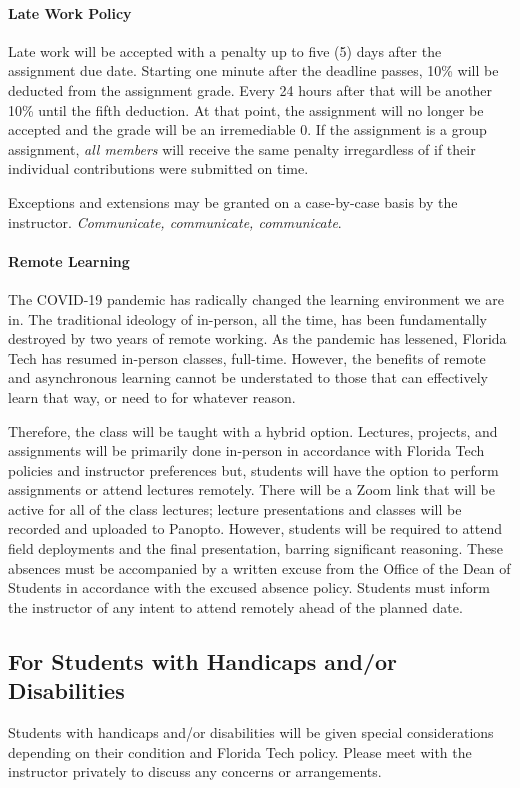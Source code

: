 \documentclass[
	letterpaper, %
	fontsize=10pt, %
	twoside=true, %
	numbers=noenddot, %
]{kaobook}
\begin{document}
\paragraph*{Late Work Policy} Late work will be accepted with a penalty up to five (5) days after the assignment due date.
Starting one minute after the deadline passes, 10\% will be deducted from the assignment grade.
Every 24 hours after that will be another 10\% until the fifth deduction.
At that point, the assignment will no longer be accepted and the grade will be an irremediable 0.
If the assignment is a group assignment, \emph{all members} will receive the same penalty irregardless of if their individual contributions were submitted on time.

Exceptions and extensions may be granted on a case-by-case basis by the instructor.
\emph{Communicate, communicate, communicate}.

\paragraph*{Remote Learning} The COVID-19 pandemic has radically changed the learning environment we are in.
The traditional ideology of in-person, all the time, has been fundamentally destroyed by two years of remote working.
As the pandemic has lessened, Florida Tech has resumed in-person classes, full-time.
However, the benefits of remote and asynchronous learning cannot be understated to those that can effectively learn that way, or need to for whatever reason.

Therefore, the class will be taught with a hybrid option.
Lectures, projects, and assignments will be primarily done in-person in accordance with Florida Tech policies and instructor preferences but, students will have the option to perform assignments or attend lectures remotely.
There will be a Zoom link that will be active for all of the class lectures; lecture presentations and classes will be recorded and uploaded to Panopto.
However, students will be required to attend field deployments and the final presentation, barring significant reasoning.
These absences must be accompanied by a written excuse from the Office of the Dean of Students in accordance with the excused absence policy.
Students must inform the instructor of any intent to attend remotely ahead of the planned date.

\subsection*{For Students with Handicaps and/or Disabilities} \label{ssec:accommodations}
Students with handicaps and/or disabilities will be given special considerations depending on their condition and Florida Tech policy. Please meet with the instructor privately to discuss any concerns or arrangements. 
\end{document}
